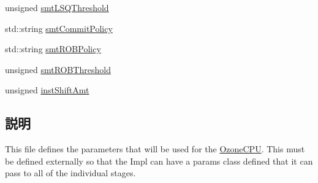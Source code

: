 \begin{DoxyCompactItemize}
\item 
unsigned \hyperlink{classSimpleParams_a3b40cd762a995346b42f9e6d16dc5853}{smtLSQThreshold}
\item 
std::string \hyperlink{classSimpleParams_a30054bc56f4e1af73b452074fc6953e8}{smtCommitPolicy}
\item 
std::string \hyperlink{classSimpleParams_a16864cb8429df19365414552cb9f4b14}{smtROBPolicy}
\item 
unsigned \hyperlink{classSimpleParams_af6b98773542dfe9808171a717309a277}{smtROBThreshold}
\item 
unsigned \hyperlink{classSimpleParams_a8ad2ee60a6143561753205840ad144e7}{instShiftAmt}
\end{DoxyCompactItemize}


\subsection{説明}
This file defines the parameters that will be used for the \hyperlink{classOzoneCPU}{OzoneCPU}. This must be defined externally so that the Impl can have a params class defined that it can pass to all of the individual stages. 

